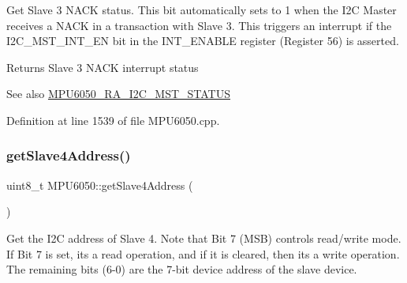 Get Slave 3 N\+A\+CK status. This bit automatically sets to 1 when the I2C Master receives a N\+A\+CK in a transaction with Slave 3. This triggers an interrupt if the I2\+C\+\_\+\+M\+S\+T\+\_\+\+I\+N\+T\+\_\+\+EN bit in the I\+N\+T\+\_\+\+E\+N\+A\+B\+LE register (Register 56) is asserted. \begin{DoxyReturn}{Returns}
Slave 3 N\+A\+CK interrupt status 
\end{DoxyReturn}
\begin{DoxySeeAlso}{See also}
\mbox{\hyperlink{MPU6050_8h_a5ef54580f436c198fb84d01288fbef49}{M\+P\+U6050\+\_\+\+R\+A\+\_\+\+I2\+C\+\_\+\+M\+S\+T\+\_\+\+S\+T\+A\+T\+US}} 
\end{DoxySeeAlso}


Definition at line 1539 of file M\+P\+U6050.\+cpp.


\begin{DoxyCode}{0}

\end{DoxyCode}
\mbox{\label{classMPU6050_a4278dec5fec25be9a6f45b51a3373ad2}} 
\subsubsection{\texorpdfstring{getSlave4Address()}{getSlave4Address()}}
{\footnotesize\ttfamily uint8\+\_\+t M\+P\+U6050\+::get\+Slave4\+Address (\begin{DoxyParamCaption}{ }\end{DoxyParamCaption})}

Get the I2C address of Slave 4. Note that Bit 7 (M\+SB) controls read/write mode. If Bit 7 is set, it\textquotesingle{}s a read operation, and if it is cleared, then it\textquotesingle{}s a write operation. The remaining bits (6-\/0) are the 7-\/bit device address of the slave device.

